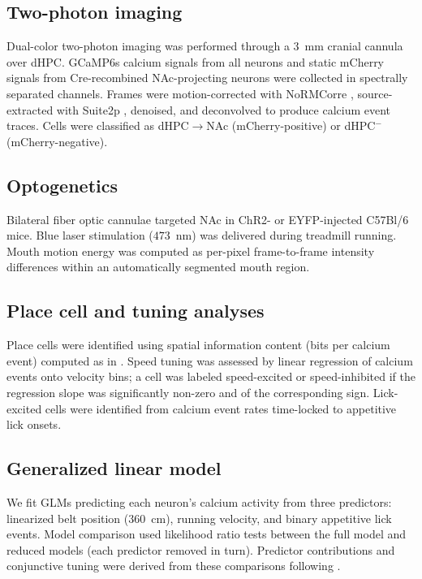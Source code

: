 \documentclass[11pt]{article}
\begin{document}
\subsection{Two-photon imaging}

Dual-color two-photon imaging was performed through a $3$~mm cranial cannula over dHPC. GCaMP6s calcium signals from all neurons and static mCherry signals from Cre-recombined NAc-projecting neurons were collected in spectrally separated channels. Frames were motion-corrected with NoRMCorre \citep{pnevmatikakis2017normcorre}, source-extracted with Suite2p \citep{pachitariu2017suite2p}, denoised, and deconvolved to produce calcium event traces. Cells were classified as dHPC$\to$NAc (mCherry-positive) or dHPC$^-$ (mCherry-negative).

\subsection{Optogenetics}

Bilateral fiber optic cannulae targeted NAc in ChR2- or EYFP-injected C57Bl/6 mice. Blue laser stimulation ($473$~nm) was delivered during treadmill running. Mouth motion energy was computed as per-pixel frame-to-frame intensity differences within an automatically segmented mouth region.

\subsection{Place cell and tuning analyses}

Place cells were identified using spatial information content (bits per calcium event) computed as in \citep{skaggs1993information,markus1994spatial}. Speed tuning was assessed by linear regression of calcium events onto velocity bins; a cell was labeled speed-excited or speed-inhibited if the regression slope was significantly non-zero and of the corresponding sign. Lick-excited cells were identified from calcium event rates time-locked to appetitive lick onsets.

\subsection{Generalized linear model}

We fit GLMs predicting each neuron's calcium activity from three predictors: linearized belt position ($360$~cm), running velocity, and binary appetitive lick events. Model comparison used likelihood ratio tests between the full model and reduced models (each predictor removed in turn). Predictor contributions and conjunctive tuning were derived from these comparisons following \citep{hardcastle2017multiplexed}.
\end{document}
